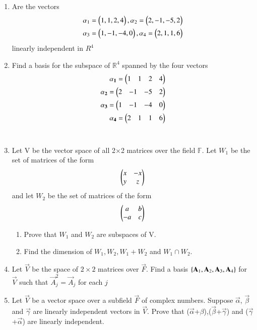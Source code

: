\renewcommand{\theequation}{\theenumi}
\renewcommand{\thefigure}{\theenumi}
\begin{enumerate}[label=\thesubsection.\arabic*.,ref=\thesubsection.\theenumi]
\item Are the vectors 
\begin{align}
\alpha{_1}=\begin{pmatrix}1,1,2,4\end{pmatrix} , \alpha{_2}=\begin{pmatrix}2,-1,-5,2\end{pmatrix} \\
\alpha{_3}=\begin{pmatrix}1,-1,-4,0\end{pmatrix} , \alpha{_4}=\begin{pmatrix}2,1,1,6\end{pmatrix}
\end{align}
linearly independent in $R^{4}$
%
\\
\solution

%
\item Find a basis for the subspace of $\mathbb{R}^{4}$ spanned by the four vectors
\begin{align}
\mathbf{\alpha_1} = \begin{pmatrix}1&1&2&4\end{pmatrix}\\
\mathbf{\alpha_2} = \begin{pmatrix}2&-1&-5&2\end{pmatrix}\\
\mathbf{\alpha_3} = \begin{pmatrix}1&-1&-4&0\end{pmatrix}\\
\mathbf{\alpha_4} = \begin{pmatrix}2&1&1&6\end{pmatrix}
\end{align}
%
\\
\solution

%
\item Let V be the vector space of all 2$\times$2 matrices over the field $\mathbb{F}$. Let $W_1$ be the set of matrices of the form 
\begin{align}
    \begin{pmatrix}x&-x\\y&z\end{pmatrix}
\end{align}
and let $W_2$ be the set of matrices of the form 
\begin{align}
    \begin{pmatrix}a&b\\-a&c\end{pmatrix}
\end{align}
%
\begin{enumerate}
    \item Prove that $W_1$ and $W_2$ are subspaces of V.
    \item Find the dimension of $W_1, W_2, W_1+W_2$ and $W_1\cap W_2$.
\end{enumerate}
%
\solution

%
\item Let $\vec{V}$ be the space of $2\times2$ matrices over $\vec{F}$. Find a basis $\left\{\mathbf{A}_1, \mathbf{A}_2, \mathbf{A}_3, \mathbf{A}_4\right\}$ for $\vec{V}$ such that $\vec{A}_j^2 = \vec{A}_j$ for each $j$
%
\\
\solution

%
\item    Let $\vec{V}$ be a vector space over a subfield $\vec{F}$ of complex numbers. Suppose $\vec{\alpha}$, $\vec{\beta}$ and $\vec{\gamma}$ are linearly independent vectors in $\vec{V}$. Prove that ($\vec{\alpha}$+$\beta$),($\vec{\beta}$+$\vec{\gamma}$) and ($\vec{\gamma}$+$\vec{\alpha}$) are linearly independent.

\end{enumerate}
